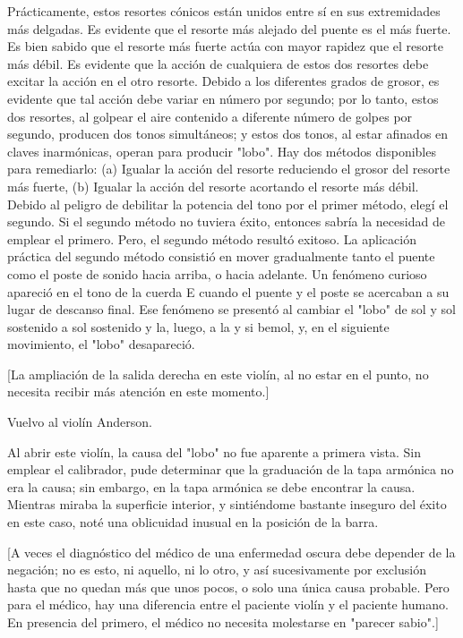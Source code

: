 \documentclass[12pt]{book}
\begin{document}
Prácticamente, estos resortes cónicos están unidos entre sí en sus extremidades más delgadas. Es evidente que el resorte más alejado del puente es el más fuerte. Es bien sabido que el resorte más fuerte actúa con mayor rapidez que el resorte más débil. Es evidente que la acción de cualquiera de estos dos resortes debe excitar la acción en el otro resorte. Debido a los diferentes grados de grosor, es evidente que tal acción debe variar en número por segundo; por lo tanto, estos dos resortes, al golpear el aire contenido a diferente número de golpes por segundo, producen dos tonos simultáneos; y estos dos tonos, al estar afinados en claves inarmónicas, operan para producir "lobo". Hay dos métodos disponibles para remediarlo: (a) Igualar la acción del resorte reduciendo el grosor del resorte más fuerte, (b) Igualar la acción del resorte acortando el resorte más débil. Debido al peligro de debilitar la potencia del tono por el primer método, elegí el segundo. Si el segundo método no tuviera éxito, entonces sabría la necesidad de emplear el primero. Pero, el segundo método resultó exitoso. La aplicación práctica del segundo método consistió en mover gradualmente tanto el puente como el poste de sonido hacia arriba, o hacia adelante. Un fenómeno curioso apareció en el tono de la cuerda E cuando el puente y el poste se acercaban a su lugar de descanso final. Ese fenómeno se presentó al cambiar el "lobo" de sol y sol sostenido a sol sostenido y la, luego, a la y si bemol, y, en el siguiente movimiento, el "lobo" desapareció.

[La ampliación de la salida derecha en este violín, al no estar en el punto, no necesita recibir más atención en este momento.]

Vuelvo al violín Anderson.

Al abrir este violín, la causa del "lobo" no fue aparente a primera vista. Sin emplear el calibrador, pude determinar que la graduación de la tapa armónica no era la causa; sin embargo, en la tapa armónica se debe encontrar la causa. Mientras miraba la superficie interior, y sintiéndome bastante inseguro del éxito en este caso, noté una oblicuidad inusual en la posición de la barra.

[A veces el diagnóstico del médico de una enfermedad oscura debe depender de la negación; no es esto, ni aquello, ni lo otro, y así sucesivamente por exclusión hasta que no quedan más que unos pocos, o solo una única causa probable. Pero para el médico, hay una diferencia entre el paciente violín y el paciente humano. En presencia del primero, el médico no necesita molestarse en "parecer sabio".]
\end{document}
